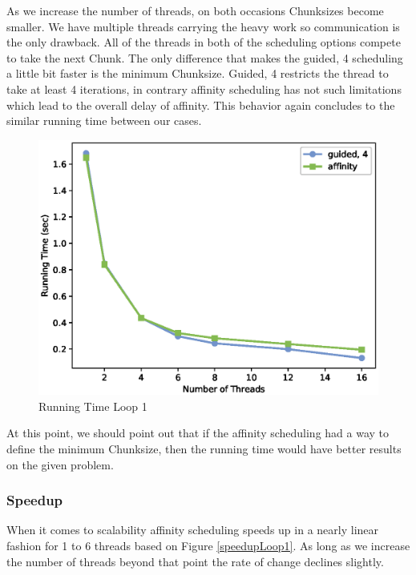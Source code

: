 \documentclass[12pt,a4paper]{article}
\begin{document}
As we increase the number of threads, on both occasions Chunksizes become smaller. We have multiple threads carrying the heavy work so communication is the only drawback. All of the threads in both of the scheduling options compete to take the next Chunk. The only difference that makes the guided, 4 scheduling a little bit faster is the minimum Chunksize. Guided, 4 restricts the thread to take at least 4 iterations, in contrary affinity scheduling has not such limitations which lead to the overall delay of affinity. This behavior again concludes to the similar running time between our cases.

\begin{figure}[ht]
    \centering
    \includegraphics[scale=0.6]{../graphs/loop1_running_time.eps}
    \caption{Running Time Loop 1}
    \label{runningTimeLoop1}
\end{figure}

At this point, we should point out that if the affinity scheduling had a way to define the minimum Chunksize, then the running time would have better results on the given problem.    

\subsubsection{Speedup}

When it comes to scalability affinity scheduling speeds up in a nearly linear fashion for 1 to 6 threads based on Figure \ref{speedupLoop1}. As long as we increase the number of threads beyond that point the rate of change declines slightly.
\end{document}
